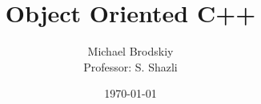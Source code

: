 


\def\code#1{\texttt{#1}}

\pagestyle{fancy}

\title{Object Oriented C++}
\date{\today}
\author{Michael Brodskiy\\ \small Professor: S. Shazli}



\maketitle

\thispagestyle{fancy}

\newpage

